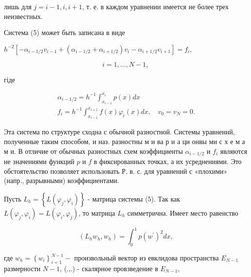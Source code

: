 \documentclass[10pt]{article}
\begin{document}
лишь для $j=i-1, i, i+1$, т. е. в каждом уравнении имеется не более трех неизвестных.



Система (5) может быть записана в виде



$h^{-2}\left[-\alpha_{i-1 / 2} v_{i-1}+\left(\alpha_{i-1 / 2}+\alpha_{i+1 / 2}\right) v_{i}-\alpha_{i+1 / 2} v_{i+1}\right]=f_{i}$,



\[

i=1, \ldots, N-1 \text {, }

\]



гіде



\[

\begin{gathered}

\alpha_{i-1 / 2}=h^{-1} \int_{x_{i-1}}^{x_{i}} p(x) d x \\

f_{i}=h^{-1} \int_{x_{i-1}}^{x_{i+1}} f(x) \varphi_{i}(x) d x, \quad v_{0}=v_{N}=0 .

\end{gathered}

\]



Эта система по структуре сходна с обычной разностной. Системы уравнений, полученные таким способом, и наз. разностны м и ва р и а ци онвы ми с х е м а м и. В отличие от обычных разностных схем коэффициенты $\alpha_{i-1 / 2}$ и $f_{i}$ являются не значениями функций $p$ и $f$ в фиксированных точках, а их усреднениями. Это обстоятельство позволяет использовать Р. в. с. для уравнений с «плохими» (напр., разрывными) коэффициентами.



Пусть $L_{h}=\left\{L\left(\varphi_{j}, \varphi_{i}\right)\right\}$ - матрица системы (5). Так как $L\left(\varphi_{j}, \varphi_{i}\right)=L\left(\varphi_{i}, \varphi_{j}\right)$, то матрица $L_{h}$ симметрична. Имеет место равенство



\[

\left(L_{h} w_{h}, w_{h}\right)=\int_{0}^{1} p\left(w^{\prime}\right)^{2} d x,

\]



где $w_{h}=\left\{w_{i}\right\}_{i=1}^{N-1}-$ произвольный вектор из евклидова пространства $E_{N-1}$ размерности $N-1$, (.,.) - скалярное провзведение в $E_{N-1}$,
\end{document}
